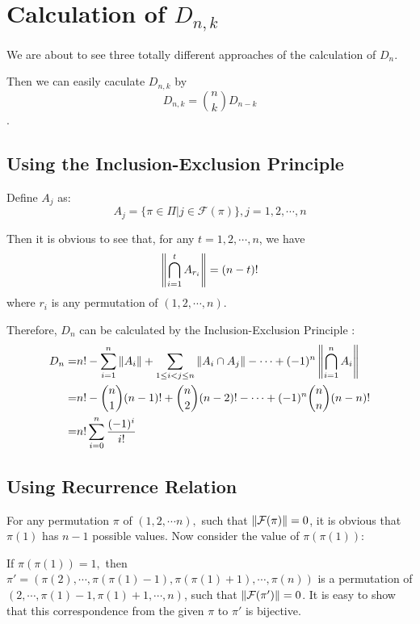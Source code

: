
\section{Calculation of $ D_{n,k}$}
\label{sec:f-calc}
We are about to see three totally different approaches of the calculation of $ D_{n}$.

Then we can easily caculate $ D_{n,k}$ by
\[ D_{n,k} = {n\choose{k}}D_{n-k}\].

\subsection{Using the Inclusion-Exclusion Principle}

      Define $ A_j$ as:
      \[ A_j =  \{ \pi \in \Pi | j \in \mathcal{F}(\pi)\}, j = 1,2,\cdots ,n\]

      Then it is obvious to see that, for any $ t = 1,2,\cdots ,n$, we have
      \[ \card{\bigcap_{i=1}^{t}A_{r_i}} = (n-t)!\]
      where $ r_i$ is any permutation of $ (1,2,\cdots ,n).$

      Therefore, $ D_n$ can be calculated by the Inclusion-Exclusion Principle :
       \begin{align*}
       D_n = & n! - \sum_{i=1}^n\card{A_i} + \sum_{1\le i< j\le n}{\card{A_i\cap A_j}}-\cdots +
      (-1)^n\card{\bigcap_{i=1}^n{A_i}}\\
      =& n! - {n\choose{1}}(n-1)! + {n\choose{2}}(n-2)!-\cdots +(-1)^n{n\choose{n}}(n-n)!\\
      =& n!\sum_{i=0}^n{\dfrac{(-1)^i}{i!}}
      \end{align*}

      \subsection{Using Recurrence Relation}

     For any permutation $\pi$ of $ (1,2,\cdots n),$ such that $ \left\|\mathcal{F}(\pi)\right\| = 0$,
     it is obvious that $ \pi(1)$ has $ n-1$ possible values.
     Now consider the value of $ \pi(\pi(1)):$

     If $ \pi(\pi(1)) = 1, $ then $\pi'= (\pi(2),\cdots ,\pi(\pi(1)-1), \pi(\pi(1)+1), \cdots ,\pi(n))$
     is a permutation of
     $ (2,\cdots ,\pi(1)-1, \pi(1)+1, \cdots ,n)$, such that $\left\|\mathcal{F}(\pi')\right\| = 0$.
     It is easy to show that this correspondence from the given $ \pi$ to $ \pi'$ is bijective.

